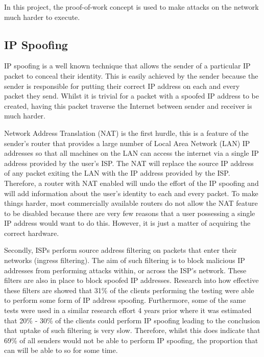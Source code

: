 \documentclass[ %
                    author={Luke Murray},
                supervisor={Dr. Simon Hollis},
                     title={Shadow Peer-to-Peer Networks},
                  subtitle={},
                    degree={MEng},
                      year={2013} ]{thesis}
\begin{document}
In this project, the proof-of-work concept is used to make attacks on the network much harder to execute.

\subsection{IP Spoofing}

IP spoofing\cite{tanase2003ip} is a well known technique that allows the sender of a particular IP packet to conceal their identity. This is easily achieved by the sender because the sender is responsible for putting their correct IP address on each and every packet they send. Whilst it is trivial for a packet with a spoofed IP address to be created, having this packet traverse the Internet between sender and receiver is much harder.

Network Address Translation (NAT) is the first hurdle, this is a feature of the sender's router that provides a large number of Local Area Network (LAN) IP addresses so that all machines on the LAN can access the internet via a single IP address provided by the user's ISP. The NAT will replace the source IP address of any packet exiting the LAN with the IP address provided by the ISP. Therefore, a router with NAT enabled will undo the effort of the IP spoofing and will add information about the user's identity to each and every packet. To make things harder, most commercially available routers do not allow the NAT feature to be disabled because there are very few reasons that a user possessing a single IP address would want to do this. However, it is just a matter of acquiring the correct hardware.

Secondly, ISPs perform source address filtering on packets that enter their networks (ingress filtering). The aim of such filtering is to block malicious IP addresses from performing attacks within, or across the ISP's network. These filters are also in place to block spoofed IP addresses. Research into how effective these filters are showed that 31\% of the clients performing the testing were able to perform some form of IP address spoofing\cite{beverly2009understanding}. Furthermore, some of the same tests were used in a similar research effort 4 years prior\cite{bb-spoofer-sruti} where it was estimated that 20\% - 30\% of the clients could perform IP spoofing leading to the conclusion that uptake of such filtering is very slow. Therefore, whilst this does indicate that 69\% of all senders would not be able to perform IP spoofing, the proportion that can will be able to so for some time.
\end{document}
